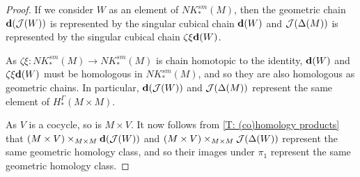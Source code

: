 \begin{proof}
	If we consider $W$ as an element of $NK_*^{sm}(M)$, then the geometric chain $\mathbf{d}(\mathcal{J}(W))$ is represented by the singular cubical chain $\mathbf{d}(W)$ and $\mathcal{J}(\Delta(M))$ is represented by the singular cubical chain $\zeta\xi\mathbf{d}(W)$.

	As $\zeta\xi: NK_*^{sm}(M) \to NK_*^{sm}(M)$ is chain homotopic to the identity, $\mathbf{d}(W)$ and $\zeta\xi\mathbf{d}(W)$ must be homologous in $NK_*^{sm}(M)$, and so they are also homologous as geometric chains.
	In particular, $\mathbf{d}(\mathcal{J}(W))$ and $\mathcal{J}(\Delta(M))$ represent the same element of $H_*^\Gamma(M \times M)$.

	As $V$ is a cocycle, so is $M \times V$.
	It now follows from \cref{T: (co)homology products} that
	$(M \times V)\times_{M \times M} \mathbf{d}(\mathcal{J}(W))$ and $(M \times V)\times_{M \times M} \mathcal{J}(\Delta(W))$ represent the same geometric homology class, and so their images under $\pi_1$ represent the same geometric homology class.
\end{proof}

\begin{comment}Let $E$ be a face of the cubulation.
	Then we can think of $E$ as corresponding to a smooth singular cubical chain represented by the embedding $S_E \colon \interval^n \to M$.
	Then $\diag(\mc J(W))$ is the geometric chain represented by the smooth singular cubical chain $\diag S_E \colon \interval^n \to M \times M$, while $\mc J(\Delta(M))$ is the geometric chain represented by the smooth singular cubical chain $\zeta\xi(\diag S_E)$.
	So, more generally, $\diag(\mc J(W))$ and $\mc J(\Delta(W)))$ must be homologous in $NK^{sm}(M)$.
	So there is a smooth cubical chain $Z$ with $\bd Z = \diag(\mc J(W))-\mc J(\Delta(W)))$ as normalized smooth cubical chains.
	Now thinking of $H$ as a geometric chain, by Lemma \ref{L: product transversal}, we can find a cocycle $V'$ homologous to $V$ so that $M \times V'$ is transverse to $Z$.
	Now we compute using the boundary formula of Proposition \ref{P: Leibniz cap} and that $M \times V'$ is a cocycle that
	\begin{align*}
		\bd((M \times V')&\times_{M \times M} Z)\\
		& = \pm(\bd(M \times V'))\times_{M \times M} Z +(M \times V')\times_{M \times M} \bd Z \\
		& = (M \times V')\times_{M \times M} (\diag(\mc J(W))-\mc J(\Delta(W)))\\
		& = (M \times V')\times_{M \times M} \diag(\mc J(W)) - (M \times V')\times_{M \times M} \mc J(\Delta(W))
	\end{align*}
	Applying $\pi_1$ and that boundaries commute with maps, we obtained the desired homology.
\end{comment}

